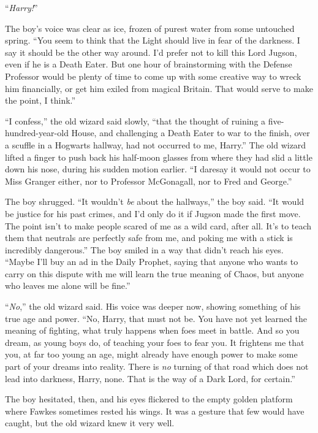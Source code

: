 ``\emph{Harry!}''

The boy's voice was clear as ice, frozen of purest water from some untouched spring. ``You seem to think that the Light should live in fear of the darkness. I say it should be the other way around. I'd prefer not to kill this Lord Jugson, even if he is a Death Eater. But one hour of brainstorming with the Defense Professor would be plenty of time to come up with some creative way to wreck him financially, or get him exiled from magical Britain. That would serve to make the point, I think.''

``I confess,'' the old wizard said slowly, ``that the thought of ruining a five-hundred-year-old House, and challenging a Death Eater to war to the finish, over a scuffle in a Hogwarts hallway, had not occurred to me, Harry.'' The old wizard lifted a finger to push back his half-moon glasses from where they had slid a little down his nose, during his sudden motion earlier. ``I daresay it would not occur to Miss Granger either, nor to Professor McGonagall, nor to Fred and George.''

The boy shrugged. ``It wouldn't \emph{be} about the hallways,'' the boy said. ``It would be justice for his past crimes, and I'd only do it if Jugson made the first move. The point isn't to make people scared of me as a wild card, after all. It's to teach them that neutrals are perfectly safe from me, and poking me with a stick is incredibly dangerous.'' The boy smiled in a way that didn't reach his eyes. ``Maybe I'll buy an ad in the Daily Prophet, saying that anyone who wants to carry on this dispute with me will learn the true meaning of Chaos, but anyone who leaves me alone will be fine.''

``\emph{No},'' the old wizard said. His voice was deeper now, showing something of his true age and power. ``No, Harry, that must not be. You have not yet learned the meaning of fighting, what truly happens when foes meet in battle. And so you dream, as young boys do, of teaching your foes to fear you. It frightens me that you, at far too young an age, might already have enough power to make some part of your dreams into reality. There is \emph{no} turning of that road which does not lead into darkness, Harry, none. That is the way of a Dark Lord, for certain.''

The boy hesitated, then, and his eyes flickered to the empty golden platform where Fawkes sometimes rested his wings. It was a gesture that few would have caught, but the old wizard knew it very well.

